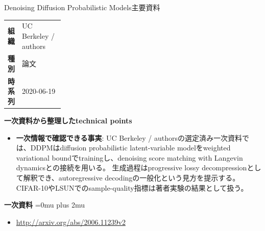 \begin{technicalnote}{Denoising Diffusion Probabilistic Models}{主要資料}
\begingroup
\begin{tabularx}{\linewidth}{@{}>{\bfseries}p{0.22\linewidth}X@{}}
組織 & UC Berkeley / authors \\
種別 & 論文 \\
時系列 & 2020-06-19 \\
\end{tabularx}
\smallskip
{\bfseries 一次資料から整理したtechnical points}
\begin{itemize}[leftmargin=1.5em,itemsep=0.35em]
\item \textbf{一次情報で確認できる事実}: UC Berkeley / authorsの選定済み一次資料では、DDPMはdiffusion probabilistic latent-variable modelをweighted variational boundでtrainingし、denoising score matching with Langevin dynamicsとの接続を用いる。 生成過程はprogressive lossy decompressionとして解釈でき、autoregressive decodingの一般化という見方を提示する。 CIFAR-10やLSUNでのsample-quality指標は著者実験の結果として扱う。
\end{itemize}
\begin{minipage}{\linewidth}
\begin{samepage}
{\bfseries 一次資料}
\begingroup\sloppy
\Urlmuskip=0mu plus 2mu\relax
\begin{itemize}[leftmargin=1.5em,itemsep=0.25em]
\item {\scriptsize\url{http://arxiv.org/abs/2006.11239v2}}
\end{itemize}
\endgroup
\end{samepage}
\end{minipage}
\endgroup
\end{technicalnote}
\medskip

